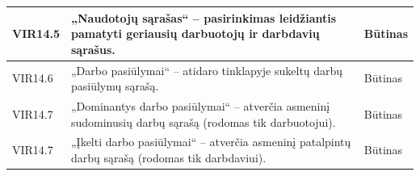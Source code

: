 \documentclass{VUMIFPSkursinis}
\begin{document}
\begin{table}[H]
\begin{tabular}{|p{2cm}|p{10cm}|p{3cm}|}
VIR14.5 & \multicolumn{1}{m{10cm}|}{„Naudotojų sąrašas“ – pasirinkimas leidžiantis pamatyti geriausių darbuotojų ir darbdavių sąrašus.} & Būtinas \\ \hline
VIR14.6 & \multicolumn{1}{m{10cm}|}{„Darbo pasiūlymai“ – atidaro tinklapyje sukeltų darbų pasiūlymų sąrašą.} & Būtinas \\ \hline
VIR14.7 & \multicolumn{1}{m{10cm}|}{„Dominantys darbo pasiūlymai“ – atverčia asmeninį sudominusių darbų sąrašą (rodomas tik darbuotojui).} & Būtinas \\ \hline
VIR14.7 & \multicolumn{1}{m{10cm}|}{„Įkelti darbo pasiūlymai“ – atverčia asmeninį patalpintų darbų sąrašą (rodomas tik darbdaviui).} & Būtinas \\ \hline
\end{tabular}
\end{table}
\end{document}
